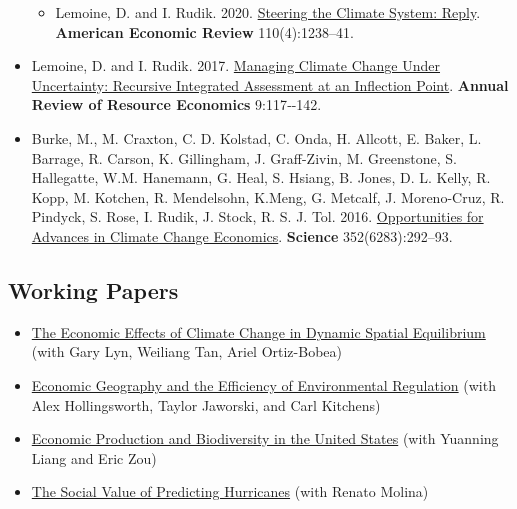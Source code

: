 \documentclass[11pt]{res} %
\begin{document}
\begin{resume}
\begin{itemize}
	\begin{itemize}
		\item[] Lemoine, D. and I. Rudik. 2020.  \href{http://papers.ssrn.com/sol3/papers.cfm?abstract_id=2443594}{Steering the Climate System: Reply}. \textbf{American Economic Review} 110(4):1238--41.
	\end{itemize}
	\item[] Lemoine, D. and I. Rudik. 2017. \href{https://papers.ssrn.com/sol3/papers.cfm?abstract_id=2862211}{Managing Climate Change Under Uncertainty: Recursive Integrated Assessment at an Inflection Point}.  \textbf{Annual Review of Resource Economics} 9:117‐-142.
	\item[]  Burke, M., M. Craxton, C. D. Kolstad, C. Onda, H. Allcott, E. Baker, L. Barrage, R. Carson, K. Gillingham, J. Graff-Zivin, M. Greenstone, S. Hallegatte, W.M. Hanemann, G. Heal, S. Hsiang, B. Jones, D. L. Kelly, R. Kopp, M. Kotchen, R. Mendelsohn, K.Meng, G. Metcalf, J. Moreno-Cruz, R. Pindyck, S. Rose, I. Rudik, J. Stock, R. S. J. Tol. 2016. \href{http://science.sciencemag.org/content/352/6283/292.abstract}{Opportunities for Advances in Climate Change Economics}. \textbf{Science} 352(6283):292--93.
\end{itemize} 


\vspace{-.2in}


\subsection{Working Papers}

\begin{itemize} %
	\item[] \href{https://osf.io/preprints/socarxiv/usghb}{The Economic Effects of Climate Change in Dynamic Spatial Equilibrium} (with Gary Lyn, Weiliang Tan, Ariel Ortiz-Bobea)
	\item[]\href{https://osf.io/preprints/socarxiv/x6fuw/}{Economic Geography and the Efficiency of Environmental Regulation} (with Alex Hollingsworth, Taylor Jaworski, and Carl Kitchens)
	\item[] \href{https://osf.io/preprints/socarxiv/qy76a}{Economic Production and Biodiversity in the United States} (with Yuanning Liang and Eric Zou)
	\item[] \href{https://ivanrudik.com}{The Social Value of Predicting Hurricanes} (with Renato Molina)
\end{itemize}

\vspace{-.2in}


\end{resume}
\end{document}
